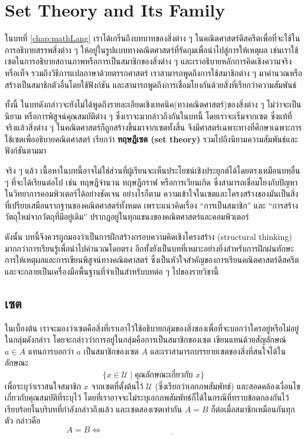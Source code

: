 \chapter{Set Theory and Its Family}

ในบทที่ \ref{chap:mathLang} เราได้เกริ่นถึงบทบาทของสิ่งต่าง ๆ ในคณิตศาสตร์ดีสครีตเพื่อที่จะใช้ในการอธิบายสรรพสิ่งต่าง ๆ ให้อยู่ในรูปแบบทางคณิตศาสตร์ที่รัดกุมเพื่อนำไปสู่การให้เหตุผล เช่นเราใช้เซตในการอธิบายสถานภาพหรือการเป็นสมาชิกของสิ่งต่าง ๆ และเราอธิบายหลักการคิดเชิงความจริงหรือเท็จ รวมถึงวิธีการแปลภาษาด้วยตรรกศาสตร์ เราสามารถพูดถึงการใช้สมาชิกต่าง ๆ มาคำนวณหรือสร้างเป็นสมาชิกตัวอื่นโดยใช้ฟังก์ชัน และสามารถพูดถึงการเชื่อมโยงกันด้วยสิ่งที่เรียกว่าความสัมพันธ์

ทั้งนี้ ในบทดังกล่าวจะยังไม่ได้พูดถึงรายละเอียดเชิงเทคนิค(ทางคณิตศาสตร์)ของสิ่งต่าง ๆ ไม่ว่าจะเป็นนิยาม หรือการพิสูจน์คุณสมบัติต่าง ๆ ซึ่งเราจะมากล่าวถึงกันในบทนี้ โดยเราจะเริ่มจากเซต ซึ่งแท้ที่จริงแล้วสิ่งต่าง ๆ ในคณิตศาสตร์ก็ถูกสร้างขึ้นมาจากเซตทั้งสิ้น จึงมีศาสตร์เฉพาะทางที่ศึกษาเฉพาะการใช้เซตเพื่ออธิบายคณิตศาสตร์ เรียกว่า \textbf{ทฤษฎีเซต (set theory)} รวมไปถึงนิยามความสัมพันธ์และฟังก์ชันตามมา

จริง ๆ แล้ว เนื้อหาในบทนี้อาจไม่ใช่ส่วนที่ผู้เรียนจะเห็นประโยชน์เชิงประยุกต์ได้โดยตรงเหมือนบทอื่น ๆ ที่จะได้เรียนต่อไป เช่น ทฤษฎีจำนวน ทฤษฎีกราฟ หรือการเวียนเกิด ซึ่งสามารถเชื่อมโยงกับปัญหาในวิทยาการคอมพิวเตอร์ได้อย่างชัดเจน อย่างไรก็ตาม ความเข้าใจในเซตและโครงสร้างของมันเป็นสิ่งที่เปรียบเสมือนรากฐานของคณิตศาสตร์ทั้งหมด เพราะแนวคิดเรื่อง “การเป็นสมาชิก” และ “การสร้างวัตถุใหม่จากวัตถุที่มีอยู่เดิม” ปรากฏอยู่ในทุกแขนงของคณิตศาสตร์และคอมพิวเตอร์

ดังนั้น บทนี้จึงควรถูกมองว่าเป็นการฝึกสร้างกรอบความคิดเชิงโครงสร้าง (structural thinking) มากกว่าการเรียนรู้เพื่อนำไปคำนวณโดยตรง อีกทั้งยังเป็นบทที่เหมาะอย่างยิ่งสำหรับการฝึกฝนทักษะการให้เหตุผลและการเขียนพิสูจน์ทางคณิตศาสตร์ ซึ่งเป็นหัวใจสำคัญของการเรียนคณิตศาสตร์ดีสครีต และจะกลายเป็นเครื่องมือพื้นฐานที่จำเป็นสำหรับบทต่อ ๆ ไปของรายวิชานี้

\section{เซต}
ในเบื้องต้น เราจะมองว่าเซตคือสิ่งที่เราเอาไว้ใช้อธิบายกลุ่มของสิ่งของเพื่อที่จะบอกว่าใครอยู่หรือไม่อยู่ในกลุ่มดังกล่าว โดยจะกล่าวว่าการอยู่ในกลุ่มคือการเป็นสมาชิกของเซต เขียนแทนด้วยสัญลักษณ์ $a \in A$ แทนการบอกว่า $a$ เป็นสมาชิกของเซต $A$ และเราสามารถบรรยายเซตของสิ่งที่สนใจได้ในลักษณะ
$$
\{ x \in \mathcal{U} \mid \text{คุณลักษณะเกี่ยวกับ $x$}\}
$$
เพื่อระบุว่าเราสนใจสมาชิก $x$ จากเซตที่ตั้งต้นไว้ $\mathcal{U}$ (ซึ่งเรียกว่าเอกภพสัมพัทธ์) และสอดคล้องเงื่อนไขเกี่ยวกับคุณสมบัติที่ระบุไว้ โดยที่เราอาจจะไม่ระบุเอกภพสัมพัทธ์ก็ได้ในกรณีที่ทราบข้อตกลงกันไว้เรียบร้อยในบริบทที่กำลังกล่าวถึงแล้ว และเซตสองเซตเท่ากัน $A=B$ ก็ต่อเมื่อสมาชิกเหมือนกันทุกตัว กล่าวคือ
$$
A = B \iff \underline{\hspace{7cm}}
$$

